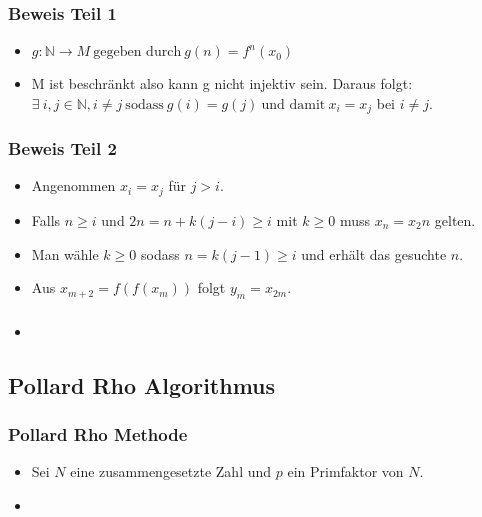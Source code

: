 \documentclass[mathserif]{beamer}
\begin{document}
\begin{frame}
  \frametitle{Beweis Teil 1}
  \begin{itemize}
    \item<1->  $g:\mathbb{N} \rightarrow M \ \text{gegeben durch} \ g(n)=f^n(x_0)$
      \vspace{3mm}
    \item<2-> M ist beschr\"ankt also kann g nicht injektiv sein. Daraus folgt:\\
	        $\exists \ i,j \in \mathbb{N}, i\not=j \ \text{sodass} \ g(i)=g(j) \ \text{und damit} \ x_i=x_j$ bei $i\not=j$.
 
  \end{itemize}
\end{frame}

\begin{frame}
  \frametitle{Beweis Teil 2}
  \begin{itemize}
    \item<1-> Angenommen $x_i=x_j$ f\"ur $j>i$.
     \vspace{3mm}
    \item<2-> Falls $n\geq i$ und $2n=n+k(j-i)\geq i$ mit $k\geq 0$ muss $x_n=x_2n$ gelten.
     \vspace{3mm}
    \item<3-> Man w\"ahle $k\geq 0$ sodass $n=k(j-1)\geq i$ und erh\"alt das gesuchte $n$.
     \vspace{3mm}
    \item<4-> Aus $x_{m+2}=f(f(x_m))$ folgt $y_m = x_{2m}$.
  \end{itemize}
\end{frame}

\begin{frame}
  \frametitle{}
  \begin{itemize}
    \item 
  \end{itemize}
\end{frame}


\subsection{Pollard Rho Algorithmus}
\begin{frame}
  \frametitle{Pollard Rho Methode}
  \begin{itemize}
    \item Sei $N$ eine zusammengesetzte Zahl und $p$ ein Primfaktor von $N$.
    \item 
  \end{itemize}
\end{frame}
\end{document}
